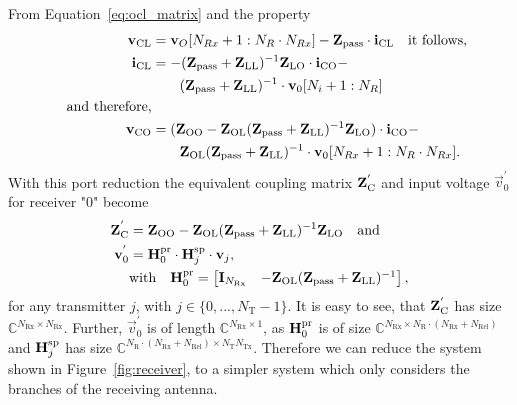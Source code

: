 From Equation~\eqref{eq:ocl_matrix} and the property
\begin{align}
\mathbf{v}_\text{CL} &= \mathbf{v}_O[N_{Rx}+1:N_R\cdot N_{Rx}]-\mathbf{Z}_{\text{pass}}\cdot\mathbf{i}_\text{CL}\quad\text{it follows,}\\
\mathbf{i}_\text{CL} &= -(\mathbf{Z}_{\text{pass}} + \mathbf{Z}_\text{LL})^{-1}\mathbf{Z}_\text{LO}\cdot\mathbf{i}_\text{CO} -\\\nonumber
&\qquad (\mathbf{Z}_{\text{pass}} + \mathbf{Z}_\text{LL})^{-1}\cdot\mathbf{v}_{0}[N_i+1:N_R]\\\nonumber\quad\text{and therefore,}&\\
\mathbf{v}_\text{CO} &= (\mathbf{Z}_\text{OO}-\mathbf{Z}_\text{OL}(\mathbf{Z}_{\text{pass}} + \mathbf{Z}_\text{LL})^{-1}\mathbf{Z}_\text{LO})\cdot\mathbf{i}_\text{CO} -\\\nonumber&\qquad \mathbf{Z}_\text{OL}(\mathbf{Z}_{\text{pass}} + \mathbf{Z}_\text{LL})^{-1}\cdot\mathbf{v}_0[N_{Rx}+1:N_R\cdot N_{Rx}].
\end{align}
With this port reduction the equivalent coupling matrix $\mathbf{Z}_\text{C}^{'}$ and input voltage $\vec{v}_0^{'}$ for receiver "0" become
\begin{align}
\label{eq:port_reduction}
\mathbf{Z}_\text{C}^{'}&= \mathbf{Z}_\text{OO} - \mathbf{Z}_\text{OL}(\mathbf{Z}_{\text{pass}} + \mathbf{Z}_\text{LL})^{-1}\mathbf{Z}_\text{LO}\quad\text{and}\\
\mathbf{v}_0^{'} &= \mathbf{H}_0^{\text{pr}} \cdot\mathbf{H}_{j}^{\text{sp}}\cdot \mathbf{v}_j,\\\nonumber
&\text{with}\quad\mathbf{H}_0^{\text{pr}}=
\begin{bmatrix}
\mathbf{I}_{N_\text{Rx}} & -\mathbf{Z}_\text{OL}(\mathbf{Z}_{\text{pass}} + \mathbf{Z}_\text{LL})^{-1}
\end{bmatrix},
\end{align}
for any transmitter $j$, with $j\in\{0,...,N_\text{T}-1\}$.
It is easy to see, that $\mathbf{Z}_\text{C}^{'}$ has size $\mathbb{C}^{N_\text{Rx}\times N_\text{Rx}}$.
Further, $\vec{v}_0^{'}$ is of length $\mathbb{C}^{N_\text{Rx}\times 1}$, as 
$\mathbf{H}_0^{\text{pr}}$ is of size 
	$\mathbb{C}^{N_\text{Rx}\times N_\text{R}\cdot\left(N_\text{Rx}+N_\text{Rel}\right)}$ 
and $\mathbf{H}_j^{\text{sp}}$ has size 
	$\mathbb{C}^{N_\text{R}\cdot\left(N_\text{Rx}+N_\text{Rel}\right)\times N_\text{T}N_\text{Tx}}$.
Therefore we can reduce the system shown in Figure~\ref{fig:receiver}, to a simpler system which only considers the branches of the receiving antenna.





